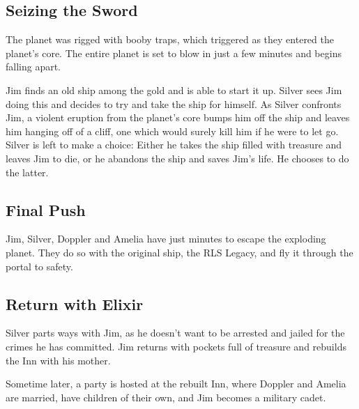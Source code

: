 \documentclass[notitlepage]{fhnwreport}
\begin{document}
\begin{multicols}{2}
\subsection*{Seizing the Sword}

The planet was  rigged  with  booby traps, which triggered as they entered the
planet's  core.  The  entire  planet is set to blow in just a few minutes  and
begins falling apart.

Jim finds an old ship among the gold and  is  able to start it up. Silver sees
Jim  doing  this  and  decides to try and take the ship for himself. As Silver
confronts Jim, a violent eruption from  the  planet's  core  bumps him off the
ship and leaves him hanging off of a cliff, one which would surely kill him if
he were to  let  go. Silver is left to make a choice: Either he takes the ship
filled  with treasure and leaves Jim to die, or he abandons the ship and saves
Jim's life. He chooses to do the latter.

\subsection*{Final Push}

Jim,  Silver,  Doppler  and  Amelia  have just minutes to escape the exploding
planet. They  do so with the original ship, the RLS Legacy, and fly it through
the portal to safety.

\subsection*{Return with Elixir}

Silver parts ways with Jim, as he doesn't want  to  be arrested and jailed for
the crimes  he  has  committed.  Jim returns with pockets full of treasure and
rebuilds the Inn with his mother.

Sometime later, a party is hosted at the rebuilt Inn, where Doppler and Amelia
are married,  have  children  of  their own, and Jim becomes a military cadet.

\printbibliography

\end{multicols}
\end{document}
